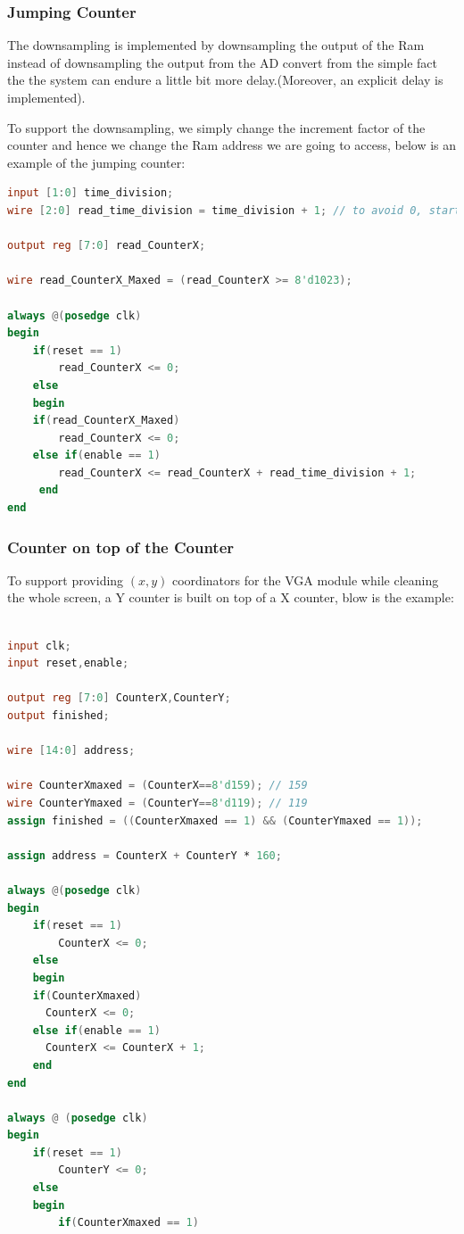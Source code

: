 \documentclass[11pt]{scrartcl}
\begin{document}
\subsubsection{Jumping Counter}
The downsampling is implemented by downsampling the output of the Ram instead of downsampling the output from the AD convert from the simple fact the the system can endure a little bit more delay.(Moreover, an explicit delay is implemented).

To support the downsampling, we simply change the increment factor of the counter and hence we change the Ram address we are going to access, below is an example of the jumping counter:
 
\begin{lstlisting}[language=Verilog]
input [1:0] time_division;
wire [2:0] read_time_division = time_division + 1; // to avoid 0, start from 1

output reg [7:0] read_CounterX;

wire read_CounterX_Maxed = (read_CounterX >= 8'd1023);

always @(posedge clk)
begin
	if(reset == 1)
		read_CounterX <= 0;
	else
	begin
	if(read_CounterX_Maxed)
	  	read_CounterX <= 0;
	else if(enable == 1)
	  	read_CounterX <= read_CounterX + read_time_division + 1;
	 end
end
\end{lstlisting}
\subsubsection{Counter on top of the Counter}
To support providing $(x,y)$ coordinators for the VGA module while cleaning the whole screen, a Y counter is built on top of a X counter, blow is the example:
\begin{lstlisting}[language=Verilog]

input clk;
input reset,enable;

output reg [7:0] CounterX,CounterY;
output finished;

wire [14:0] address;

wire CounterXmaxed = (CounterX==8'd159); // 159
wire CounterYmaxed = (CounterY==8'd119); // 119
assign finished = ((CounterXmaxed == 1) && (CounterYmaxed == 1));

assign address = CounterX + CounterY * 160;

always @(posedge clk)
begin
	if(reset == 1)
		CounterX <= 0;
	else
	begin
	if(CounterXmaxed)
	  CounterX <= 0;
	else if(enable == 1)
	  CounterX <= CounterX + 1;
	end
end

always @ (posedge clk)
begin
	if(reset == 1)
		CounterY <= 0;
	else
	begin
		if(CounterXmaxed == 1)
\end{lstlisting}
\end{document}
